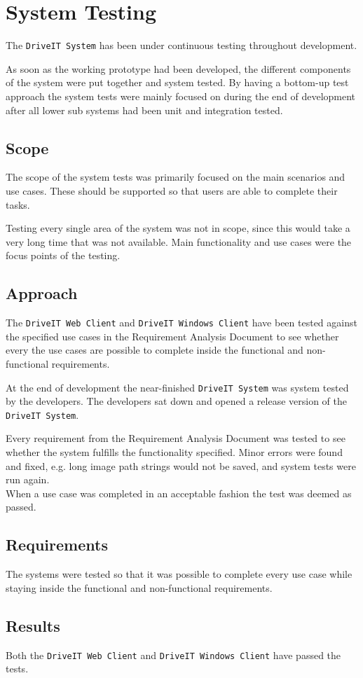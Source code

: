 \section{System Testing}
The \texttt{DriveIT System} has been under continuous testing throughout development.

As soon as the working prototype had been developed, the different components of the system were put together and system tested. 
By having a bottom-up test approach the system tests were mainly focused on during the end of development after all lower sub systems had been unit and integration tested.

\subsection{Scope}
The scope of the system tests was primarily focused on the main scenarios and use cases. 
These should be supported so that users are able to complete their tasks. 

Testing every single area of the system was not in scope, since this would take a very long time that was not available.
Main functionality and use cases were the focus points of the testing.

\subsection{Approach}
The \texttt{DriveIT Web Client} and \texttt{DriveIT Windows Client} have been tested against the specified use cases in the Requirement Analysis Document to see whether every the use cases are possible to complete inside the functional and non-functional requirements.

At the end of development the near-finished \texttt{DriveIT System} was system tested by the developers. The developers sat down and opened a release version of the \texttt{DriveIT System}.

Every requirement from the Requirement Analysis Document was tested to see whether the system fulfills the functionality specified.
Minor errors were found and fixed, e.g. long image path strings would not be saved, and system tests were run again.\\
When a use case was completed in an acceptable fashion the test was deemed as passed.

\subsection{Requirements}
The systems were tested so that it was possible to complete every use case while staying inside the functional and non-functional requirements.

\subsection{Results}
Both the \texttt{DriveIT Web Client} and \texttt{DriveIT Windows Client} have passed the tests.